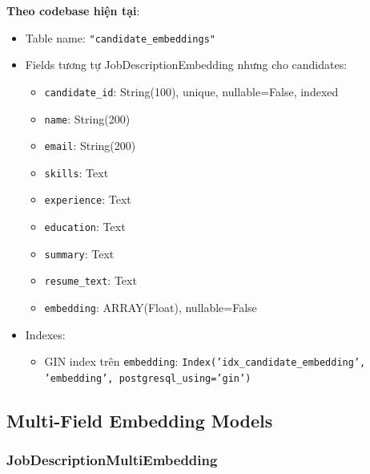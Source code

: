 \textbf{Theo codebase hiện tại}:
\begin{itemize}
    \item Table name: \texttt{"candidate\_embeddings"}
    \item Fields tương tự JobDescriptionEmbedding nhưng cho candidates:
    \begin{itemize}
        \item \texttt{candidate\_id}: String(100), unique, nullable=False, indexed
        \item \texttt{name}: String(200)
        \item \texttt{email}: String(200)
        \item \texttt{skills}: Text
        \item \texttt{experience}: Text
        \item \texttt{education}: Text
        \item \texttt{summary}: Text
        \item \texttt{resume\_text}: Text
        \item \texttt{embedding}: ARRAY(Float), nullable=False
    \end{itemize}
    \item Indexes:
    \begin{itemize}
        \item GIN index trên \texttt{embedding}: \texttt{Index('idx\_candidate\_embedding', 'embedding', postgresql\_using='gin')}
    \end{itemize}
\end{itemize}

\subsection{Multi-Field Embedding Models}

\subsubsection{JobDescriptionMultiEmbedding}

